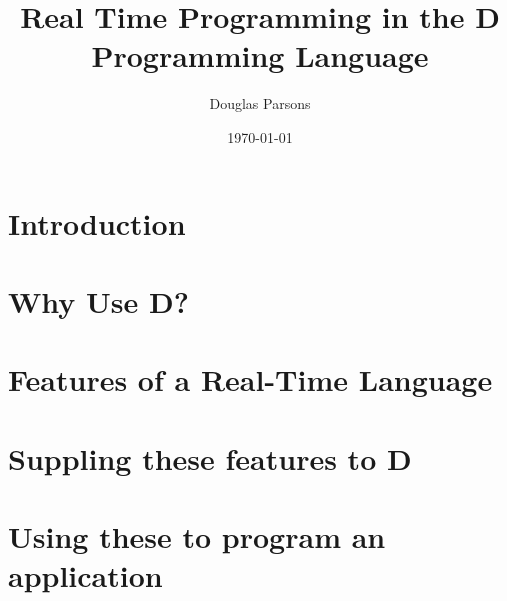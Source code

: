 \documentclass[a4paper, 11pt]{article}
\title{Real Time Programming in the D Programming Language}
\author{Douglas Parsons}
\date{\today}
\begin{document}
\maketitle
%
\section{Introduction}

\section{Why Use D?}

\section{Features of a Real-Time Language}

\section{Suppling these features to D}
\section{Using these to program an application}
%
%
%
\end{document}
